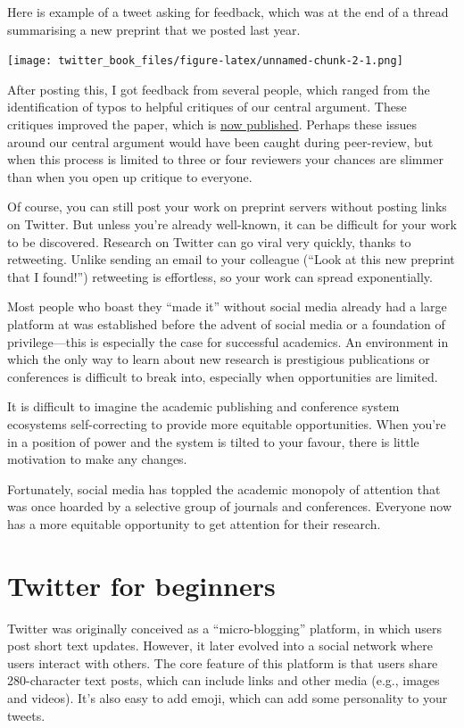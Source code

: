 \documentclass[
]{book}
\begin{document}
Here is example of a tweet asking for feedback, which was at the end of a thread summarising a new preprint that we posted last year.

\texttt{[image: twitter\_book\_files/figure-latex/unnamed-chunk-2-1.png]}

After posting this, I got feedback from several people, which ranged from the identification of typos to helpful critiques of our central argument. These critiques improved the paper, which is \href{https://pubmed.ncbi.nlm.nih.gov/32360118/}{now published}. Perhaps these issues around our central argument would have been caught during peer-review, but when this process is limited to three or four reviewers your chances are slimmer than when you open up critique to everyone.

Of course, you can still post your work on preprint servers without posting links on Twitter. But unless you're already well-known, it can be difficult for your work to be discovered. Research on Twitter can go viral very quickly, thanks to retweeting. Unlike sending an email to your colleague (``Look at this new preprint that I found!'') retweeting is effortless, so your work can spread exponentially.

Most people who boast they ``made it'' without social media already had a large platform at was established before the advent of social media or a foundation of privilege---this is especially the case for successful academics. An environment in which the only way to learn about new research is prestigious publications or conferences is difficult to break into, especially when opportunities are limited.

It is difficult to imagine the academic publishing and conference system ecosystems self-correcting to provide more equitable opportunities. When you're in a position of power and the system is tilted to your favour, there is little motivation to make any changes.

Fortunately, social media has toppled the academic monopoly of attention that was once hoarded by a selective group of journals and conferences. Everyone now has a more equitable opportunity to get attention for their research.

\hypertarget{beginner}{%
\chapter{Twitter for beginners}\label{beginner}}

Twitter was originally conceived as a ``micro-blogging'' platform, in which users post short text updates. However, it later evolved into a social network where users interact with others. The core feature of this platform is that users share 280-character text posts, which can include links and other media (e.g., images and videos). It's also easy to add emoji, which can add some personality to your tweets.
\end{document}

